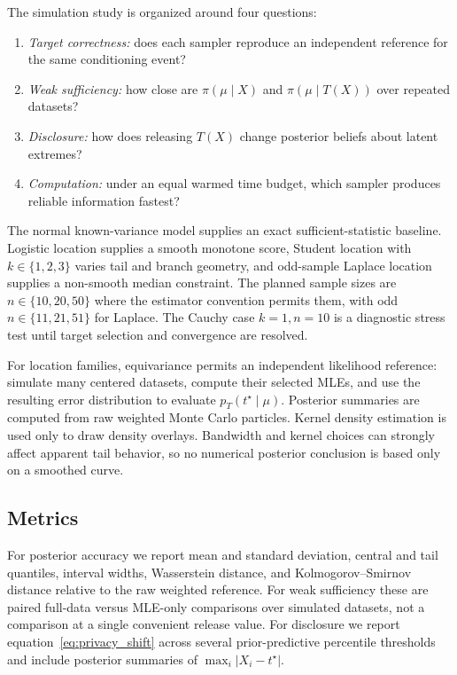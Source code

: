 \documentclass[smallextended,natbib,runningheads]{svjour3}
\begin{document}
The simulation study is organized around four questions:
\begin{enumerate}
  \item \emph{Target correctness:} does each sampler reproduce an independent
  reference for the same conditioning event?
  \item \emph{Weak sufficiency:} how close are
  $\pi(\mu\mid X)$ and $\pi(\mu\mid T(X))$ over repeated datasets?
  \item \emph{Disclosure:} how does releasing $T(X)$ change posterior beliefs
  about latent extremes?
  \item \emph{Computation:} under an equal warmed time budget, which sampler
  produces reliable information fastest?
\end{enumerate}

The normal known-variance model supplies an exact sufficient-statistic
baseline.  Logistic location supplies a smooth monotone score, Student
location with $k\in\{1,2,3\}$ varies tail and branch geometry, and odd-sample
Laplace location supplies a non-smooth median constraint.  The planned sample
sizes are $n\in\{10,20,50\}$ where the estimator convention permits them, with
odd $n\in\{11,21,51\}$ for Laplace.  The Cauchy case $k=1,n=10$ is a diagnostic
stress test until target selection and convergence are resolved.

For location families, equivariance permits an independent likelihood
reference: simulate many centered datasets, compute their selected MLEs, and
use the resulting error distribution to evaluate
$p_T(t^\star\mid\mu)$.  Posterior summaries are computed from raw weighted
Monte Carlo particles.  Kernel density estimation is used only to draw density
overlays.  Bandwidth and kernel choices can strongly affect apparent tail
behavior, so no numerical posterior conclusion is based only on a smoothed
curve.

\subsection{Metrics}

For posterior accuracy we report mean and standard deviation, central and tail
quantiles, interval widths, Wasserstein distance, and Kolmogorov--Smirnov
distance relative to the raw weighted reference.  For weak sufficiency these
are paired full-data versus MLE-only comparisons over simulated datasets, not
a comparison at a single convenient release value.  For disclosure we report
equation~\eqref{eq:privacy_shift} across several prior-predictive percentile
thresholds and include posterior summaries of $\max_i|X_i-t^\star|$.
\end{document}
